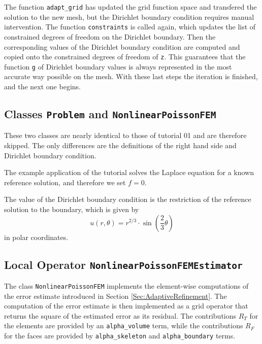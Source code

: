 \documentclass[a4paper,12pt]{article}
\begin{document}

The function \lstinline{adapt_grid} has updated the grid function space and transfered the
solution to the new mesh, but the Dirichlet boundary condition requires manual intervention.
The function \lstinline{constraints} is called again, which updates the list of constrained
degrees of freedom on the Dirichlet boundary. Then the corresponding values of the Dirichlet
boundary condition are computed and copied onto the constrained degrees of freedom of
\lstinline{z}. This guarantees that the function \lstinline{g} of Dirichlet boundary values
is always represented in the most accurate way possible on the mesh. With these last steps
the iteration is finished, and the next one begins.

\subsection{Classes \lstinline{Problem} and \lstinline{NonlinearPoissonFEM}}

These two classes are nearly identical to those of tutorial 01 and are therefore skipped.
The only differences are the definitions of the right hand side and Dirichlet boundary
condition.


The example application of the tutorial solves the Laplace equation for a known reference
solution, and therefore we set $f = 0$.


The value of the Dirichlet boundary condition is the restriction of the reference solution
to the boundary, which is given by
\begin{equation*}
  u (r, \theta) = r^{2/3} \cdot \sin\left(\frac{2}{3} \theta\right)
\end{equation*}
in polar coordinates.

\subsection{Local Operator \lstinline{NonlinearPoissonFEMEstimator}}

The class \lstinline{NonlinearPoissonFEM} implements the
element-wise computations of the error estimate introduced in
Section \ref{Sec:AdaptiveRefinement}. The computation of the error
estimate is then implemented as a grid operator that returns the square of the
estimated error as its residual. The contributions $R_T$ for the elements
are provided by an \lstinline{alpha_volume} term, while the contributions
$R_F$ for the faces are provided by \lstinline{alpha_skeleton} and
\lstinline{alpha_boundary} terms.
\end{document}
